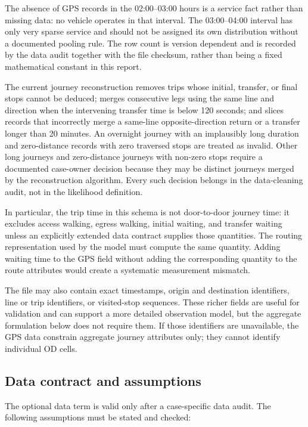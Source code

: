 The absence of GPS records in the 02:00--03:00 hours is a service fact rather
than missing data: no vehicle operates in that interval.  The 03:00--04:00
interval has only very sparse service and should not be assigned its own
distribution without a documented pooling rule.  The row count is version
dependent and is recorded by the data audit together with the file checksum,
rather than being a fixed mathematical constant in this report.

The current journey reconstruction removes trips whose initial, transfer, or
final stops cannot be deduced; merges consecutive legs using the same line and
direction when the intervening transfer time is below 120 seconds; and slices
records that incorrectly merge a same-line opposite-direction return or a
transfer longer than 20 minutes.  An overnight journey with an implausibly
long duration and zero-distance records with zero traversed stops are treated
as invalid.  Other long journeys and zero-distance journeys with non-zero
stops require a documented case-owner decision because they may be distinct
journeys merged by the reconstruction algorithm.  Every such decision belongs
in the data-cleaning audit, not in the likelihood definition.

In particular, the trip time in this schema is not door-to-door journey time:
it excludes access walking, egress walking, initial waiting, and transfer
waiting unless an explicitly extended data contract supplies those quantities.
The routing representation used by the model must compute the same quantity.
Adding waiting time to the GPS field without adding the corresponding quantity
to the route attributes would create a systematic measurement mismatch.

The file may also contain exact timestamps, origin and destination identifiers,
line or trip identifiers, or visited-stop sequences.  These richer fields are
useful for validation and can support a more detailed observation model, but
the aggregate formulation below does not require them.  If those identifiers
are unavailable, the GPS data constrain aggregate journey attributes only; they
cannot identify individual OD cells.

\subsection{Data contract and assumptions}

The optional data term is valid only after a case-specific data audit.  The
following assumptions must be stated and checked:

